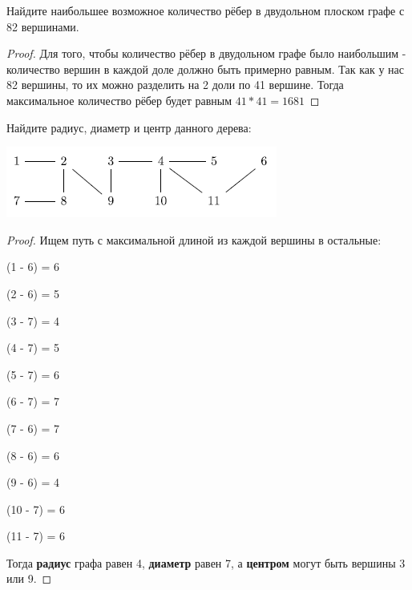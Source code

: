 \begin{problem}[7]

	Найдите наибольшее возможное количество рёбер в двудольном плоском графе с 82 вершинами.
    
\end{problem}

\begin{proof}

    Для того, чтобы количество рёбер в двудольном графе было наибольшим -  количество вершин в каждой доле должно быть примерно равным. Так как у нас 82 вершины, то их можно разделить на 2 доли по 41 вершине. Тогда максимальное количество рёбер будет равным $41 * 41 = 1681$

\end{proof}

\begin{problem}[9]

	Найдите радиус, диаметр и центр данного дерева:
    
    \centering\includegraphics[width=0.6\linewidth]{pics/9thGraph.png}
    
\end{problem}

\begin{proof}

    Ищем путь с максимальной длиной из каждой вершины в остальные:

    (1 - 6) = 6

    (2 - 6) = 5

    (3 - 7) = 4

    (4 - 7) = 5

    (5 - 7) = 6

    (6 - 7) = 7

    (7 - 6) = 7

    (8 - 6) = 6

    (9 - 6) = 4

    (10 - 7) = 6

    (11 - 7) = 6

    Тогда \textbf{радиус} графа равен 4, \textbf{диаметр} равен 7, а \textbf{центром} могут быть вершины 3 или 9.

\end{proof}

